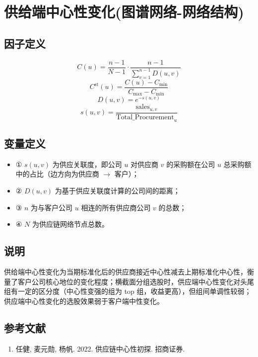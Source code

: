 \documentclass{article}
\begin{document}
\section{供给端中心性变化(图谱网络-网络结构)}

\subsection{因子定义}
\begin{equation}
    C(u) = \frac{n-1}{N-1} \cdot \frac{n-1}{\sum_{v=1}^{n-1} D(u, v)}
\end{equation}
\begin{equation}
    C^{\mathrm{st}}(u) = \frac{C(u) - C_{\mathrm{min}}}{C_{\mathrm{max}} - C_{\mathrm{min}}}
\end{equation}
\begin{equation}
    D(u, v) = e^{-s(u, v)}
\end{equation}
\begin{equation}
    s(u, v) = \frac{\mathrm{sales}_{u,v}}{\mathrm{Total\_Procurement}_u}
\end{equation}

\subsection{变量定义}
\begin{itemize}
    \item ① \( s(u, v) \) 为供应关联度，即公司 \( u \) 对供应商 \( v \) 的采购额在公司 \( u \) 总采购额中的占比（边方向为供应商 $\rightarrow$ 客户）；
    \item ② \( D(u, v) \) 为基于供应关联度计算的公司间的距离；
    \item ③ \( n \) 为与客户公司 \( u \) 相连的所有供应商公司 \( v \) 的总数；
    \item ④ \( N \) 为供应链网络节点总数。
\end{itemize}

\subsection{说明}
供给端中心性变化为当期标准化后的供应商接近中心性减去上期标准化中心性，衡量了客户公司核心地位的变化程度；横截面分组选股时，供应端中心性变化对头尾组有一定的区分度（中心性变强的组为 top 组，收益更高），但组间单调性较弱；供应端中心性变化的选股效果弱于客户端中性变化。

\subsection{参考文献}
\begin{enumerate}
    \item 任健, 麦元勋, 杨帆. 2022. 供应链中心性初探. 招商证券.
\end{enumerate}
\end{document}
